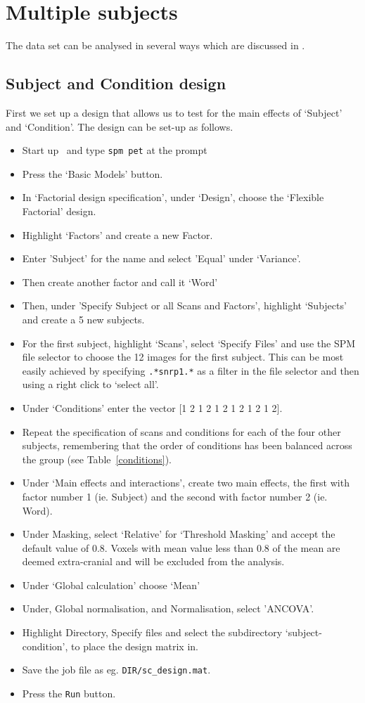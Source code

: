 \section{Multiple subjects}

The data set can be analysed in several ways  which are discussed in \cite{stefan_hbf2}.

\subsection{Subject and Condition design}

First we set up a design that allows us to test for the main effects of `Subject' and `Condition'. The design can be set-up as follows.
\begin{itemize}
\item{Start up \matlab\ and type \texttt{spm pet} at the prompt}
\item{Press the `Basic Models' button.}
\item{In `Factorial design specification', under `Design', choose the `Flexible Factorial' design.}
\item{Highlight `Factors' and create a new Factor.}
\item{Enter 'Subject' for the name and select 'Equal' under `Variance'.}
\item{Then create another factor and call it `Word'}
\item{Then, under 'Specify Subject or all Scans and Factors', highlight `Subjects' and create a 5 new subjects.}
\item{For the first subject, highlight `Scans', select `Specify Files' and use the SPM file selector to choose the 12 images for the first subject. This can be most easily achieved by specifying \texttt{.*snrp1.*} as a filter in the file selector and then using a right click to `select all'.}
\item{Under `Conditions' enter the vector [1 2 1 2 1 2 1 2 1 2 1 2].}
\item{Repeat the specification of scans and conditions for each of the four other subjects, remembering that the order of conditions has been balanced across the group (see Table~\ref{conditions}).}
\item{Under `Main effects and interactions', create two main effects, the first with factor number 1 (ie. Subject) and the second with factor number 2 (ie. Word).}
\item{Under Masking, select `Relative' for `Threshold Masking' and accept the default value of 0.8. Voxels with mean value less than 0.8 of the mean are deemed extra-cranial and will be excluded from the analysis.}
\item{Under `Global calculation' choose `Mean'}
\item{Under, Global normalisation, and Normalisation, select 'ANCOVA'.}
\item{Highlight Directory, Specify files and select the subdirectory `subject-condition', to place the design matrix in.}
\item{Save the job file as eg. \texttt{DIR/sc\_design.mat}.}
\item{Press the \texttt{Run} button.}
\end{itemize}
